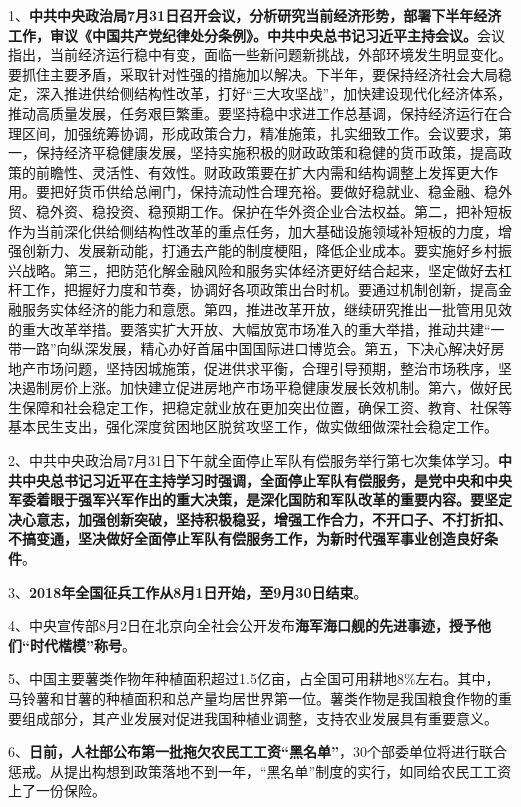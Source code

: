 1、{\textbf{中共中央政治局7月31日召开会议，分析研究当前经济形势，部署下半年经济工作，审议《中国共产党纪律处分条例》。中共中央总书记习近平主持会议。}}会议指出，当前经济运行稳中有变，面临一些新问题新挑战，外部环境发生明显变化。要抓住主要矛盾，采取针对性强的措施加以解决。下半年，要保持经济社会大局稳定，深入推进供给侧结构性改革，打好``三大攻坚战''，加快建设现代化经济体系，推动高质量发展，任务艰巨繁重。要坚持稳中求进工作总基调，保持经济运行在合理区间，加强统筹协调，形成政策合力，精准施策，扎实细致工作。会议要求，第一，保持经济平稳健康发展，坚持实施积极的财政政策和稳健的货币政策，提高政策的前瞻性、灵活性、有效性。财政政策要在扩大内需和结构调整上发挥更大作用。要把好货币供给总闸门，保持流动性合理充裕。要做好稳就业、稳金融、稳外贸、稳外资、稳投资、稳预期工作。保护在华外资企业合法权益。第二，把补短板作为当前深化供给侧结构性改革的重点任务，加大基础设施领域补短板的力度，增强创新力、发展新动能，打通去产能的制度梗阻，降低企业成本。要实施好乡村振兴战略。第三，把防范化解金融风险和服务实体经济更好结合起来，坚定做好去杠杆工作，把握好力度和节奏，协调好各项政策出台时机。要通过机制创新，提高金融服务实体经济的能力和意愿。第四，推进改革开放，继续研究推出一批管用见效的重大改革举措。要落实扩大开放、大幅放宽市场准入的重大举措，推动共建``一带一路''向纵深发展，精心办好首届中国国际进口博览会。第五，下决心解决好房地产市场问题，坚持因城施策，促进供求平衡，合理引导预期，整治市场秩序，坚决遏制房价上涨。加快建立促进房地产市场平稳健康发展长效机制。第六，做好民生保障和社会稳定工作，把稳定就业放在更加突出位置，确保工资、教育、社保等基本民生支出，强化深度贫困地区脱贫攻坚工作，做实做细做深社会稳定工作。

2、中共中央政治局7月31日下午就全面停止军队有偿服务举行第七次集体学习。{\textbf{中共中央总书记习近平在主持学习时强调，全面停止军队有偿服务，是党中央和中央军委着眼于强军兴军作出的重大决策，是深化国防和军队改革的重要内容。要坚定决心意志，加强创新突破，坚持积极稳妥，增强工作合力，不开口子、不打折扣、不搞变通，坚决做好全面停止军队有偿服务工作，为新时代强军事业创造良好条件}}。

3、{\textbf{2018年全国征兵工作从8月1日开始，至9月30日结束}}。

4、中央宣传部8月2日在北京向全社会公开发布{\textbf{海军海口舰的先进事迹，授予他们``时代楷模''称号}}。

5、中国主要薯类作物年种植面积超过1.5亿亩，占全国可用耕地8\%左右。其中，马铃薯和甘薯的种植面积和总产量均居世界第一位。薯类作物是我国粮食作物的重要组成部分，其产业发展对促进我国种植业调整，支持农业发展具有重要意义。

6、{\textbf{日前，人社部公布第一批拖欠农民工工资``黑名单''}}，30个部委单位将进行联合惩戒。从提出构想到政策落地不到一年，``黑名单''制度的实行，如同给农民工工资上了一份保险。


